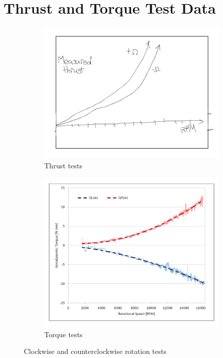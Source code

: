\section{Thrust and Torque Test Data}
\label{app:thrust-torque}
\vspace{-20pt}
\begin{figure}[htbp]
\begin{subfigure}{0.5\textwidth}
\centering
\includegraphics[width=\textwidth]{graphs/thrust-rotation}
\caption{Thrust tests}
\end{subfigure}
\begin{subfigure}{0.5\textwidth}
\centering
\includegraphics[width=\textwidth]{graphs/torque-rotation}
\caption{Torque tests}
\end{subfigure}
\caption{Clockwise and counterclockwise rotation tests}
\end{figure}
\newpage
